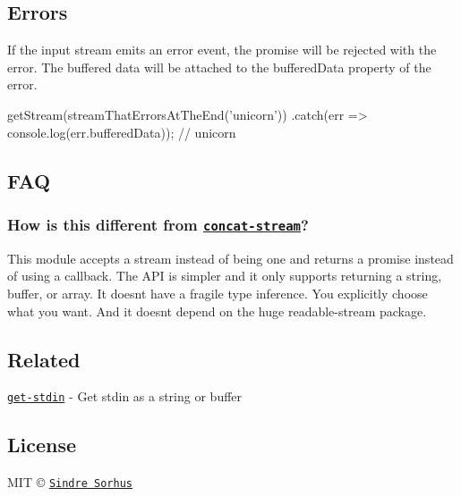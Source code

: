\subsection*{Errors}

If the input stream emits an {\ttfamily error} event, the promise will be rejected with the error. The buffered data will be attached to the {\ttfamily buffered\+Data} property of the error.


\begin{DoxyCode}
getStream(streamThatErrorsAtTheEnd('unicorn'))
  .catch(err => console.log(err.bufferedData));
// unicorn
\end{DoxyCode}


\subsection*{F\+AQ}

\subsubsection*{How is this different from \href{https://github.com/maxogden/concat-stream}{\tt {\ttfamily concat-\/stream}}?}

This module accepts a stream instead of being one and returns a promise instead of using a callback. The A\+PI is simpler and it only supports returning a string, buffer, or array. It doesn\textquotesingle{}t have a fragile type inference. You explicitly choose what you want. And it doesn\textquotesingle{}t depend on the huge {\ttfamily readable-\/stream} package.

\subsection*{Related}


\begin{DoxyItemize}
\item \href{https://github.com/sindresorhus/get-stdin}{\tt get-\/stdin} -\/ Get stdin as a string or buffer
\end{DoxyItemize}

\subsection*{License}

M\+IT © \href{https://sindresorhus.com}{\tt Sindre Sorhus} 